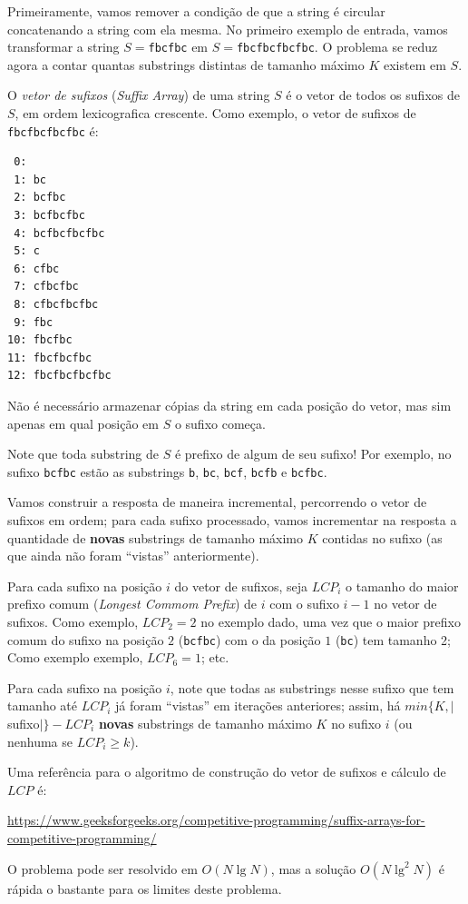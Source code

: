 
Primeiramente, vamos remover a condição de que a string é circular concatenando
a string com ela mesma. No primeiro exemplo de entrada, vamos transformar a
string $S=$\texttt{fbcfbc} em $S=$\texttt{fbcfbcfbcfbc}. O problema se reduz agora a
contar quantas substrings distintas de tamanho máximo $K$ existem em $S$.

O \textit{vetor de sufixos} (\textit{Suffix Array}) de uma string $S$ é o vetor
de todos os sufixos de $S$, em ordem lexicografica crescente. Como exemplo, o
vetor de sufixos de \texttt{fbcfbcfbcfbc} é:

\begin{verbatim}
 0:
 1: bc
 2: bcfbc
 3: bcfbcfbc
 4: bcfbcfbcfbc
 5: c
 6: cfbc
 7: cfbcfbc
 8: cfbcfbcfbc
 9: fbc
10: fbcfbc
11: fbcfbcfbc
12: fbcfbcfbcfbc
\end{verbatim}

Não é necessário armazenar cópias da string em cada posição do vetor, mas sim
apenas em qual posição em $S$ o sufixo começa.

Note que toda substring de $S$ é prefixo de algum de seu sufixo! Por exemplo, no
sufixo \texttt{bcfbc} estão as substrings \texttt{b}, \texttt{bc}, \texttt{bcf},
\texttt{bcfb} e \texttt{bcfbc}.

Vamos construir a resposta de maneira incremental, percorrendo o vetor de
sufixos em ordem; para cada sufixo processado, vamos incrementar na resposta a
quantidade de \textbf{novas} substrings de tamanho máximo $K$ contidas no
sufixo (as que ainda não foram ``vistas'' anteriormente).

Para cada sufixo na posição $i$ do vetor de sufixos, seja $LCP_i$ o tamanho do maior prefixo comum (\textit{Longest Commom
Prefix}) de $i$ com o sufixo $i-1$ no vetor de sufixos. Como exemplo,
$LCP_2 = 2$ no exemplo dado, uma vez que o maior prefixo comum do sufixo na
posição $2$ (\texttt{bcfbc}) com o da posição $1$ (\texttt{bc}) tem tamanho 2;
Como exemplo exemplo, $LCP_6 = 1$; etc.

Para cada sufixo na posição $i$, note que todas as substrings nesse sufixo que
tem tamanho até $LCP_i$ já foram ``vistas'' em iterações anteriores; assim, há
$min\{K,|$sufixo$|\} - LCP_i$ \textbf{novas} substrings de tamanho máximo $K$ no
sufixo $i$ (ou nenhuma se $LCP_i \geq k$).

Uma referência para o algoritmo de construção do vetor de sufixos e cálculo de
$LCP$ é:

\url{https://www.geeksforgeeks.org/competitive-programming/suffix-arrays-for-competitive-programming/}

O problema pode ser resolvido em $O(N\lg N)$, mas a solução $O(N\lg^2 N)$ é
rápida o bastante para os limites deste problema.
